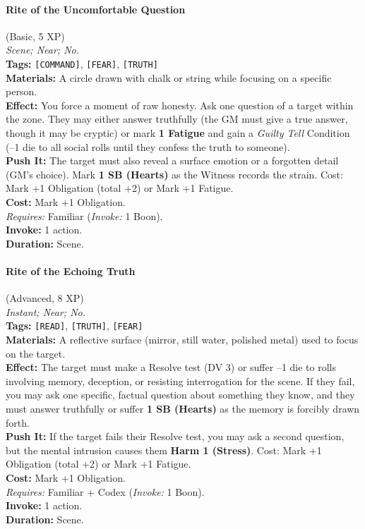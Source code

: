 \paragraph{Rite of the Uncomfortable Question} (Basic, 5 XP) \hfill \\
\emph{Scene; Near; No.} \\
\textbf{Tags:} \texttt{[COMMAND]}, \texttt{[FEAR]}, \texttt{[TRUTH]} \\
\textbf{Materials:} A circle drawn with chalk or string while focusing on a specific person. \\
\textbf{Effect:} You force a moment of raw honesty. Ask one question of a target within the zone. They may either answer truthfully (the GM must give a true answer, though it may be cryptic) or mark \textbf{1 Fatigue} and gain a \textit{Guilty Tell} Condition (--1 die to all social rolls until they confess the truth to someone). \\
\textbf{Push It:} The target must also reveal a surface emotion or a forgotten detail (GM's choice). Mark \textbf{1 SB (Hearts)} as the Witness records the strain. Cost: Mark +1 Obligation (total +2) or Mark +1 Fatigue. \\
\textbf{Cost:} Mark +1 Obligation. \\
\textit{Requires:} Familiar (\textit{Invoke:} 1 Boon). \\
\textbf{Invoke:} 1 action. \\
\textbf{Duration:} Scene.

\paragraph{Rite of the Echoing Truth} (Advanced, 8 XP) \hfill \\
\emph{Instant; Near; No.} \\
\textbf{Tags:} \texttt{[READ]}, \texttt{[TRUTH]}, \texttt{[FEAR]} \\
\textbf{Materials:} A reflective surface (mirror, still water, polished metal) used to focus on the target. \\
\textbf{Effect:} The target must make a Resolve test (DV 3) or suffer --1 die to rolls involving memory, deception, or resisting interrogation for the scene. If they fail, you may ask one specific, factual question about something they know, and they must answer truthfully or suffer \textbf{1 SB (Hearts)} as the memory is forcibly drawn forth. \\
\textbf{Push It:} If the target fails their Resolve test, you may ask a second question, but the mental intrusion causes them \textbf{Harm 1 (Stress)}. Cost: Mark +1 Obligation (total +2) or Mark +1 Fatigue. \\
\textbf{Cost:} Mark +1 Obligation. \\
\textit{Requires:} Familiar + Codex (\textit{Invoke:} 1 Boon). \\
\textbf{Invoke:} 1 action. \\
\textbf{Duration:} Scene.

